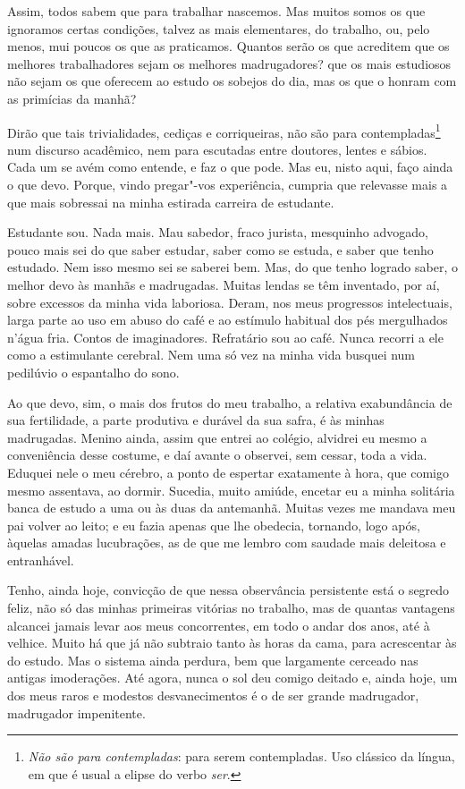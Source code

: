 Assim, todos sabem que para trabalhar nascemos. Mas muitos somos
os que ignoramos certas condições, talvez as mais elementares, do
trabalho, ou, pelo menos, mui poucos os que as praticamos. Quantos
serão os que acreditem que os melhores trabalhadores sejam os melhores
madrugadores? que os mais estudiosos não sejam os que oferecem ao
estudo os sobejos do dia, mas os que o honram com as primícias da
manhã?

Dirão que tais trivialidades, cediças e corriqueiras, não são para
contempladas\footnote{\textit{Não são para contempladas}: 
para serem contempladas. Uso clássico da língua, em que é usual a elipse do verbo \emph{ser}.} num discurso
acadêmico, nem para escutadas entre doutores, lentes e sábios. Cada um
se avém como entende, e faz o que pode. Mas eu, nisto aqui, faço ainda
o que devo. Porque, vindo pregar"-vos experiência, cumpria que relevasse
mais a que mais sobressai na minha estirada carreira de estudante.

Estudante sou. Nada mais. Mau sabedor, fraco jurista, mesquinho
advogado, pouco mais sei do que saber estudar, saber como se estuda, e
saber que tenho estudado. Nem isso mesmo sei se saberei bem. Mas, do
que tenho logrado saber, o melhor devo às manhãs e madrugadas. Muitas
lendas se têm inventado, por aí, sobre excessos da minha vida
laboriosa. Deram, nos meus progressos intelectuais, larga parte ao uso
em abuso do café e ao estímulo habitual dos pés mergulhados
n'água fria. Contos de imaginadores. Refratário sou ao
café. Nunca recorri a ele como a estimulante cerebral. Nem uma só vez
na minha vida busquei num pedilúvio o espantalho do sono.

Ao que devo, sim, o mais dos frutos do meu trabalho, a relativa
exabundância de sua fertilidade, a parte produtiva e durável da sua
safra, é às minhas madrugadas. Menino ainda, assim que entrei ao
colégio, alvidrei eu mesmo a conveniência desse costume, e daí avante o
observei, sem cessar, toda a vida. Eduquei nele o meu cérebro, a ponto
de espertar exatamente à hora, que comigo mesmo assentava, ao dormir.
Sucedia, muito amiúde, encetar eu a minha solitária banca de estudo a
uma ou às duas da antemanhã. Muitas vezes me mandava meu pai volver ao
leito; e eu fazia apenas que lhe obedecia, tornando, logo após, àquelas
amadas lucubrações, as de que me lembro com saudade mais deleitosa e
entranhável.

Tenho, ainda
hoje, convicção de que nessa observância persistente está o segredo
feliz, não só das minhas primeiras vitórias no trabalho, mas de quantas
vantagens alcancei jamais levar aos meus concorrentes, em todo o andar
dos anos, até à velhice. Muito há que já não subtraio tanto às horas da
cama, para acrescentar às do estudo. Mas o sistema ainda perdura, bem
que largamente cerceado nas antigas imoderações. Até agora, nunca o sol
deu comigo deitado e, ainda hoje, um dos meus raros e modestos
desvanecimentos é o de ser grande madrugador, madrugador impenitente.

